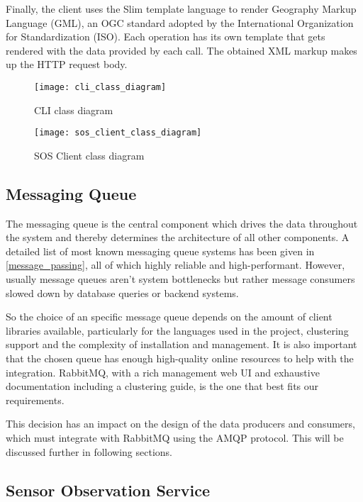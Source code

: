 Finally, the client uses the Slim template language to render Geography Markup Language (GML), an OGC standard adopted by the International Organization for Standardization (ISO). Each operation has its own template that gets rendered with the data provided by each call. The obtained XML markup makes up the HTTP request body.

\begin{sidewaysfigure}
	\texttt{[image: cli\_class\_diagram]}
	\caption{CLI class diagram}
	\label{fig:cli_class_diagram}
\end{sidewaysfigure}

\begin{sidewaysfigure}
	\texttt{[image: sos\_client\_class\_diagram]}
	\caption{SOS Client class diagram}
	\label{fig:sos_client_class_diagram}
\end{sidewaysfigure}

\subsection{Messaging Queue}

The messaging queue is the central component which drives the data throughout the system and thereby determines the architecture of all other components. A detailed list of most known messaging queue systems has been given in \ref{message_passing}, all of which highly reliable and high-performant. However, usually message queues aren't system bottlenecks but rather message consumers slowed down by database queries or backend systems.

So the choice of an specific message queue depends on the amount of client libraries available, particularly for the languages used in the project, clustering support and the complexity of installation and management. It is also important that the chosen queue has enough high-quality online resources to help with the integration. RabbitMQ, with a rich management web UI and exhaustive documentation including a clustering guide, is the one that best fits our requirements.

This decision has an impact on the design of the data producers and consumers, which must integrate with RabbitMQ using the AMQP protocol. This will be discussed further in following sections.

\subsection{Sensor Observation Service}

